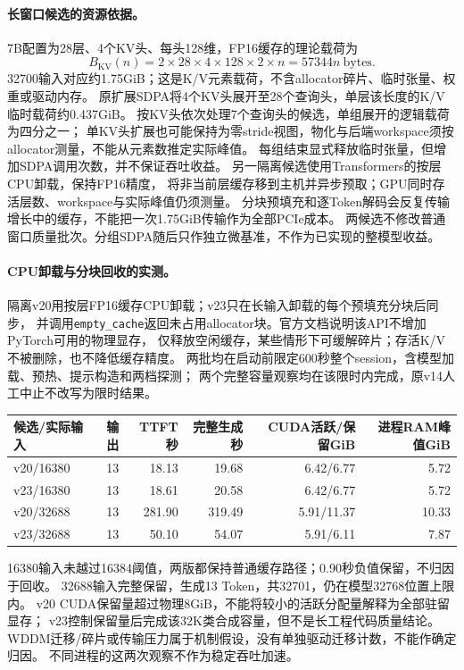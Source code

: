 \documentclass[UTF8,a4paper,11pt,fontset=fandol]{ctexart}
\begin{document}
\paragraph{长窗口候选的资源依据。}
7B配置为28层、4个KV头、每头128维，FP16缓存的理论载荷为
\[
  B_{\mathrm{KV}}(n)=2\times28\times4\times128\times2\times n
  =57344n\ \text{bytes}.
\]
32700输入对应约1.75GiB；这是K/V元素载荷，不含allocator碎片、临时张量、权重或驱动内存。
原扩展SDPA将4个KV头展开至28个查询头，单层该长度的K/V临时载荷约0.437GiB。
按KV头依次处理7个查询头的候选，单组展开的逻辑载荷为四分之一；
单KV头扩展也可能保持为零stride视图，物化与后端workspace须按allocator测量，不能从元素数推定实际峰值。
每组结束显式释放临时张量，但增加SDPA调用次数，并不保证吞吐收益。
另一隔离候选使用Transformers的按层CPU卸载\cite{kvcache}，保持FP16精度，
将非当前层缓存移到主机并异步预取；GPU同时存活层数、workspace与实际峰值仍须测量。
分块预填充和逐Token解码会反复传输增长中的缓存，不能把一次1.75GiB传输作为全部PCIe成本。
两候选不修改普通窗口质量批次。分组SDPA随后只作独立微基准，不作为已实现的整模型收益。

\paragraph{CPU卸载与分块回收的实测。}
隔离v20用按层FP16缓存CPU卸载；v23只在长输入卸载的每个预填充分块后同步，
并调用\texttt{empty\_cache}返回未占用allocator块。官方文档说明该API不增加PyTorch可用的物理显存，
仅释放空闲缓存，某些情形下可缓解碎片\cite{emptycache}；存活K/V不被删除，也不降低缓存精度。
两批均在启动前限定600秒整个session，含模型加载、预热、提示构造和两档探测；
两个完整容量观察均在该限时内完成，原v14人工中止不改写为限时结果。
\begin{center}
\setlength{\tabcolsep}{5pt}
\begin{tabular}{lrrrrr}
\toprule
候选/实际输入 & 输出 & TTFT秒 & 完整生成秒 & CUDA活跃/保留GiB & 进程RAM峰值GiB\\\midrule
v20/16380 & 13 & 18.13 & 19.68 & 6.42/6.77 & 5.72\\
v23/16380 & 13 & 18.61 & 20.58 & 6.42/6.77 & 5.72\\
v20/32688 & 13 & 281.90 & 319.49 & 5.91/11.37 & 10.33\\
v23/32688 & 13 & 50.10 & 54.07 & 5.91/6.11 & 7.87\\\bottomrule
\end{tabular}
\end{center}
16380输入未越过16384阈值，两版都保持普通缓存路径；0.90秒负值保留，不归因于回收。
32688输入完整保留，生成13 Token，共32701，仍在模型32768位置上限内。
v20 CUDA保留量超过物理8GiB，不能将较小的活跃分配量解释为全部驻留显存；
v23控制保留量后完成该32K类合成容量，但不是长工程代码质量结论。
WDDM迁移/碎片或传输压力属于机制假设，没有单独驱动迁移计数，不能作确定归因。
不同进程的这两次观察不作为稳定吞吐加速。
\end{document}
